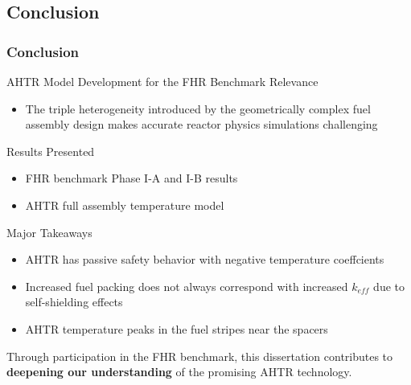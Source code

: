 \subsection{Conclusion}
\begin{frame}
    \frametitle{Conclusion}
    \begin{block}{AHTR Model Development for the FHR Benchmark}
        Relevance
        \begin{itemize}
            \item The triple heterogeneity introduced by the geometrically complex 
            fuel assembly design makes accurate reactor physics simulations challenging
        \end{itemize}
        Results Presented 
        \begin{itemize}
            \item FHR benchmark Phase I-A and I-B results
            \item AHTR full assembly temperature model 
        \end{itemize}
        Major Takeaways 
        \begin{itemize}
            \item AHTR has passive safety behavior with negative temperature coeffcients
            \item Increased fuel packing does not always correspond with increased 
            $k_{eff}$ due to self-shielding effects 
            \item AHTR temperature peaks in the fuel stripes near the spacers 
        \end{itemize}
    \end{block}

    Through participation in the FHR benchmark, this dissertation contributes to 
    \textbf{deepening our understanding} of the promising \gls{AHTR} technology. 
\end{frame}

